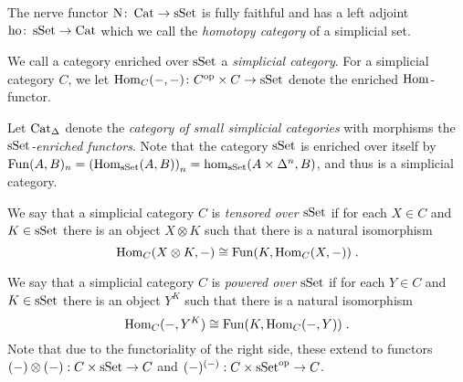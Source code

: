 \begin{lemma}\label{lem:nerveFF}
    The nerve functor $\operatorname{N}\colon\operatorname{Cat}\to\operatorname{sSet}$ is fully faithful and has a left adjoint $\operatorname{ho}\colon\operatorname{sSet}\to\operatorname{Cat}$ which we call the \emph{homotopy category} of a simplicial set.
    \begin{reference}
        \cite[Proposition 1.2.2.1]{kerodon}
    \end{reference}
\end{lemma}
\begin{definition}
    We call a category enriched over $\operatorname{sSet}$ a \emph{simplicial category}.
    For a simplicial category $C$, we let $\operatorname{Hom}_C(-,-)\colon C^{\operatorname{op}}\times C\to\operatorname{sSet}$ denote the enriched $\operatorname{Hom}$-functor.
   
    Let $\operatorname{Cat}_{\Delta}$ denote the \emph{category of small simplicial categories} with morphisms the \emph{$\operatorname{sSet}$-enriched functors}.
    Note that the category $\operatorname{sSet}$ is enriched over itself by $\operatorname{Fun}(A,B)_n=\left(\operatorname{Hom}_{\operatorname{sSet}}(A,B)\right)_n=\hom_{\operatorname{sSet}}(A\times\Delta^n,B)$, and thus is a simplicial category.
    
    We say that a simplicial category $C$ is \emph{tensored over $\operatorname{sSet}$} if for each $X\in C$ and $K\in\operatorname{sSet}$ there is an object $X\otimes K$ such that there is a natural isomorphism
    \begin{equation*}
        \operatorname{Hom}_C(X\otimes K,-)\cong\operatorname{Fun}(K,\operatorname{Hom}_C(X,-))\;.
    \end{equation*}

    We say that a simplicial category $C$ is \emph{powered over $\operatorname{sSet}$} if for each $Y\in C$ and $K\in\operatorname{sSet}$ there is an object $Y^K$ such that there is a natural isomorphism
    \begin{equation*}
        \operatorname{Hom}_C(-,Y^K)\cong\operatorname{Fun}(K,\operatorname{Hom}_C(-,Y))\;.
    \end{equation*}
    Note that due to the functoriality of the right side, these extend to functors $(-)\otimes(-):C\times\operatorname{sSet}\to C$ and $(-)^{(-)}:C\times\operatorname{sSet}^{\operatorname{op}}\to C$.
\end{definition}
